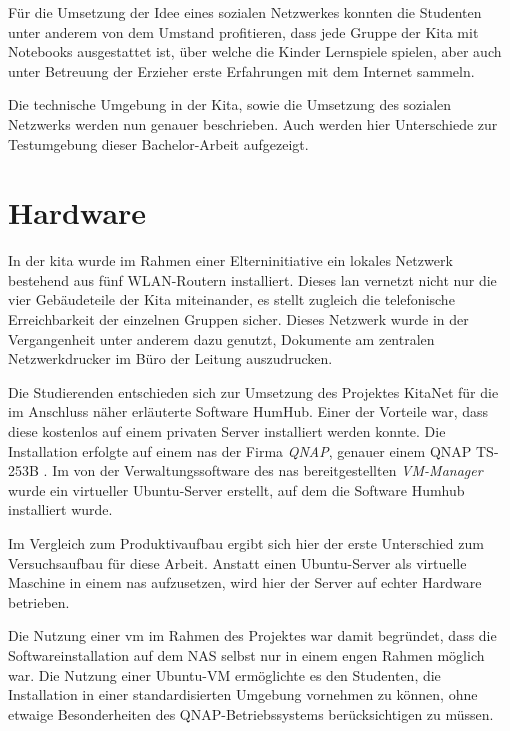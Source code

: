 Für die Umsetzung der Idee eines sozialen Netzwerkes konnten die Studenten unter anderem von dem Umstand profitieren, dass jede Gruppe der Kita mit Notebooks ausgestattet ist, über welche die Kinder Lernspiele spielen, aber auch unter Betreuung der Erzieher erste Erfahrungen mit dem Internet sammeln.

Die technische Umgebung in der Kita, sowie die Umsetzung des sozialen Netzwerks werden nun genauer beschrieben. Auch werden hier Unterschiede zur Testumgebung dieser Bachelor-Arbeit aufgezeigt.

\section{Hardware}
In der \ac{kita} wurde im Rahmen einer Elterninitiative ein lokales Netzwerk bestehend aus fünf WLAN-Routern installiert. Dieses \ac{lan} vernetzt nicht nur die vier Gebäudeteile der Kita miteinander, es stellt zugleich die telefonische Erreichbarkeit der einzelnen Gruppen sicher. Dieses Netzwerk wurde in der Vergangenheit unter anderem dazu genutzt, Dokumente am zentralen Netzwerkdrucker im Büro der Leitung auszudrucken.

Die Studierenden entschieden sich zur Umsetzung des Projektes KitaNet für die im Anschluss näher erläuterte Software HumHub.
Einer der Vorteile war, dass diese kostenlos auf einem privaten Server installiert werden konnte. Die Installation erfolgte auf einem \ac{nas} der Firma \textit{QNAP}, genauer einem QNAP TS-253B \citep[vgl.][]{qnap}. Im von der Verwaltungssoftware des \ac{nas} bereitgestellten \textit{VM-Manager} wurde ein virtueller Ubuntu-Server erstellt, auf dem die Software Humhub installiert wurde.

Im Vergleich zum Produktivaufbau ergibt sich hier der erste Unterschied zum Versuchsaufbau für diese Arbeit. Anstatt einen Ubuntu-Server als virtuelle Maschine in einem \ac{nas} aufzusetzen, wird hier der Server auf echter Hardware betrieben. 

Die Nutzung einer \ac{vm} im Rahmen des Projektes war damit begründet, dass die Softwareinstallation auf dem NAS selbst nur in einem engen Rahmen möglich war. Die Nutzung einer Ubuntu-VM ermöglichte es den Studenten, die Installation in einer standardisierten Umgebung vornehmen zu können, ohne etwaige Besonderheiten des QNAP-Betriebssystems berücksichtigen zu müssen.

